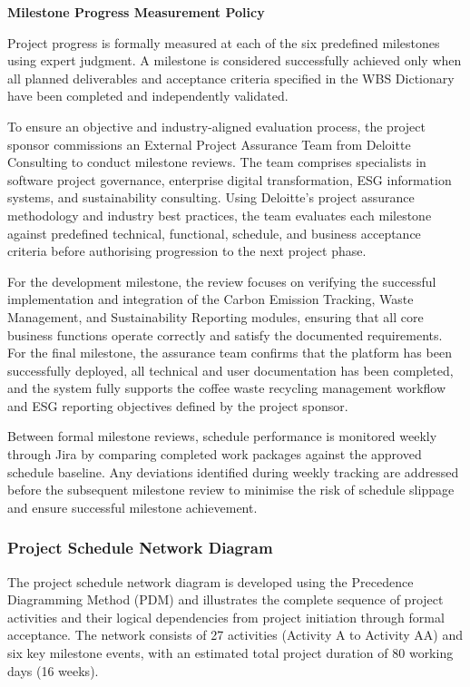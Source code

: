 \documentclass[12pt,a4paper]{article}
\begin{document}
\textbf{Milestone Progress Measurement Policy}

Project progress is formally measured at each of the six predefined milestones using expert judgment. A milestone is considered successfully achieved only when all planned deliverables and acceptance criteria specified in the WBS Dictionary have been completed and independently validated.

To ensure an objective and industry-aligned evaluation process, the project sponsor commissions an External Project Assurance Team from Deloitte Consulting to conduct milestone reviews. The team comprises specialists in software project governance, enterprise digital transformation, ESG information systems, and sustainability consulting. Using Deloitte’s project assurance methodology and industry best practices, the team evaluates each milestone against predefined technical, functional, schedule, and business acceptance criteria before authorising progression to the next project phase.

For the development milestone, the review focuses on verifying the successful implementation and integration of the Carbon Emission Tracking, Waste Management, and Sustainability Reporting modules, ensuring that all core business functions operate correctly and satisfy the documented requirements. For the final milestone, the assurance team confirms that the platform has been successfully deployed, all technical and user documentation has been completed, and the system fully supports the coffee waste recycling management workflow and ESG reporting objectives defined by the project sponsor.

Between formal milestone reviews, schedule performance is monitored weekly through Jira by comparing completed work packages against the approved schedule baseline. Any deviations identified during weekly tracking are addressed before the subsequent milestone review to minimise the risk of schedule slippage and ensure successful milestone achievement.



\subsubsection{Project Schedule Network Diagram}

\medskip
The project schedule network diagram is developed using the Precedence Diagramming Method (PDM) and illustrates the complete sequence of project activities and their logical dependencies from project initiation through formal acceptance. The network consists of 27 activities (Activity A to Activity AA) and six key milestone events, with an estimated total project duration of 80 working days (16 weeks).
\medskip
\end{document}
